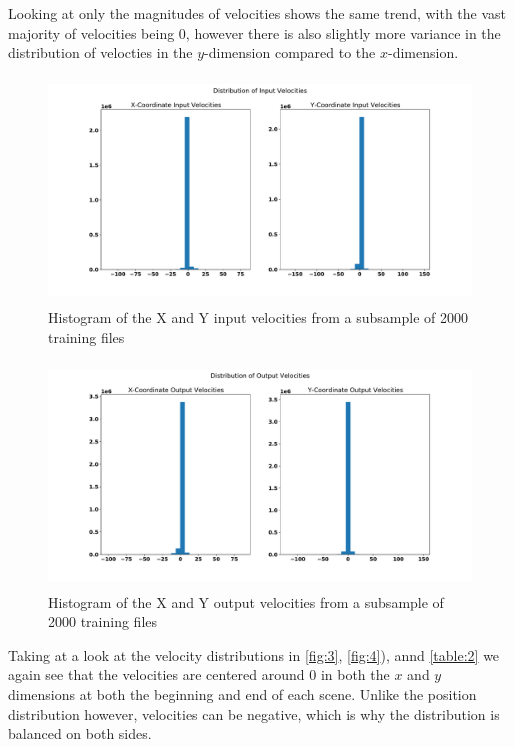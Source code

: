 \documentclass{article}
\begin{document}
        Looking at only the magnitudes of velocities shows the same trend, with the vast majority of velocities being
        0, however there is also slightly more variance in the distribution of velocties in the $y$-dimension compared to 
        the $x$-dimension.

       
        \begin{figure}[H]
            \centering
            \includegraphics[height=6cm]{figures/sample-in-velocity-hist.pdf}%
            \caption{Histogram of the X and Y input velocities from a subsample of 2000 training files}%
            \label{fig:3}
        \end{figure}
        
        \begin{figure}[H]
            \centering
            \includegraphics[height=6cm]{figures/sample-out-velocity-hist.pdf}%
            \caption{Histogram of the X and Y output velocities from a subsample of 2000 training files}%
            \label{fig:4}
        \end{figure}

        Taking at a look at the velocity distributions in \autoref{fig:3}, \autoref{fig:4}), annd \autoref{table:2} we again see that the velocities are centered around $0$ in both the $x$ and $y$ dimensions
        at both the beginning and end of each scene. Unlike the position distribution however, velocities can be negative, which is 
        why the distribution is balanced on both sides.
            
\end{document}

